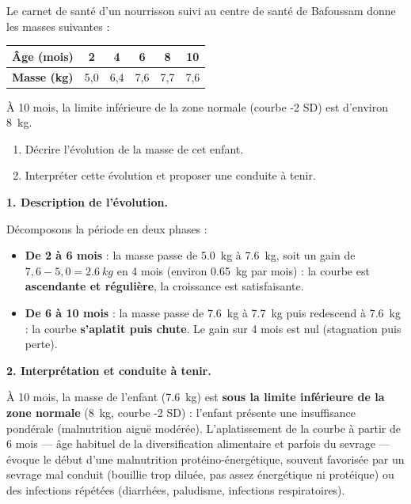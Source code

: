 \documentclass[11pt]{article}
\newcommand{\cle}[1]{{\popxbold\color{popdark}#1}}
\begin{document}
\begin{exoresolu}
Le carnet de santé d'un nourrisson suivi au centre de santé de Bafoussam donne les masses suivantes :
\begin{center}
\begin{tabular}{|l|c|c|c|c|c|}
\hline
\rowcolor{popblueL} \textbf{Âge (mois)} & 2 & 4 & 6 & 8 & 10 \\
\hline
\textbf{Masse (kg)} & 5,0 & 6,4 & 7,6 & 7,7 & 7,6 \\
\hline
\end{tabular}
\end{center}
À 10 mois, la limite inférieure de la zone normale (courbe -2 SD) est d'environ \SI{8}{kg}.
\begin{enumerate}
\item Décrire l'évolution de la masse de cet enfant.
\item Interpréter cette évolution et proposer une conduite à tenir.
\end{enumerate}
\tcblower
\textbf{1. Description de l'évolution.}

Décomposons la période en deux phases :
\begin{itemize}
\item \textbf{De 2 à 6 mois} : la masse passe de \SI{5,0}{kg} à \SI{7,6}{kg}, soit un gain de $7,6 - 5,0 = \SI{2,6}{kg}$ en 4 mois (environ \SI{0,65}{kg} par mois) : la courbe est \textbf{ascendante et régulière}, la croissance est satisfaisante.
\item \textbf{De 6 à 10 mois} : la masse passe de \SI{7,6}{kg} à \SI{7,7}{kg} puis redescend à \SI{7,6}{kg} : la courbe \textbf{s'aplatit puis chute}. Le gain sur 4 mois est nul (stagnation puis perte).
\end{itemize}

\textbf{2. Interprétation et conduite à tenir.}

À 10 mois, la masse de l'enfant (\SI{7,6}{kg}) est \textbf{sous la limite inférieure de la zone normale} (\SI{8}{kg}, courbe -2 SD) : l'enfant présente une \cle{insuffisance pondérale} (malnutrition aiguë modérée). L'aplatissement de la courbe à partir de 6 mois — âge habituel de la diversification alimentaire et parfois du sevrage — évoque le début d'une \cle{malnutrition protéino-énergétique}, souvent favorisée par un sevrage mal conduit (bouillie trop diluée, pas assez énergétique ni protéique) ou des infections répétées (diarrhées, paludisme, infections respiratoires).


\end{exoresolu}
\end{document}
